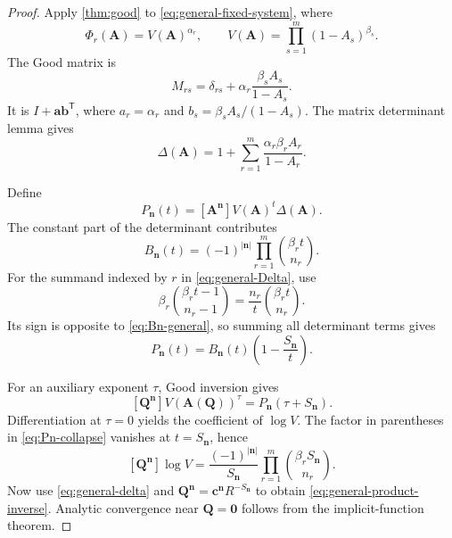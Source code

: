 \documentclass[11pt,oneside]{article}
\numberwithin{equation}{section}
\theoremstyle{plain}
\theoremstyle{definition}
\theoremstyle{remark}
\newcommand{\multi}[1]{\bm{#1}}
\begin{document}
\begin{proof}
Apply \cref{thm:good} to \cref{eq:general-fixed-system}, where
\[
 \Phi_r(\multi A)=V(\multi A)^{\alpha_r},
 \qquad
 V(\multi A)=\prod_{s=1}^m(1-A_s)^{\beta_s}.
\]
The Good matrix is
\begin{equation}\label{eq:general-Good-matrix}
 M_{rs}=\delta_{rs}
 +\alpha_r\frac{\beta_sA_s}{1-A_s}.
\end{equation}
It is \(I+\multi a\multi b^{\mathsf T}\), where
\(a_r=\alpha_r\) and
\(b_s=\beta_sA_s/(1-A_s)\).  The matrix determinant lemma gives
\begin{equation}\label{eq:general-Delta}
 \Delta(\multi A)=
 1+\sum_{r=1}^m\frac{\alpha_r\beta_rA_r}{1-A_r}.
\end{equation}

Define
\begin{equation}\label{eq:Pn-general}
 P_{\multi n}(t)=
 [\multi A^{\multi n}]V(\multi A)^t\Delta(\multi A).
\end{equation}
The constant part of the determinant contributes
\begin{equation}\label{eq:Bn-general}
 B_{\multi n}(t)=
 (-1)^{|\multi n|}
 \prod_{r=1}^m\binom{\beta_rt}{n_r}.
\end{equation}
For the summand indexed by \(r\) in \cref{eq:general-Delta}, use
\[
 \beta_r\binom{\beta_rt-1}{n_r-1}
 =\frac{n_r}{t}\binom{\beta_rt}{n_r}.
\]
Its sign is opposite to \cref{eq:Bn-general}, so summing all determinant
terms gives
\begin{equation}\label{eq:Pn-collapse}
 P_{\multi n}(t)=B_{\multi n}(t)
 \left(1-\frac{S_{\multi n}}t\right).
\end{equation}

For an auxiliary exponent \(\tau\), Good inversion gives
\begin{equation}\label{eq:general-Vtau}
 [\multi Q^{\multi n}]V(\multi A(\multi Q))^\tau
 =P_{\multi n}(\tau+S_{\multi n}).
\end{equation}
Differentiation at \(\tau=0\) yields the coefficient of \(\log V\).  The
factor in parentheses in \cref{eq:Pn-collapse} vanishes at
\(t=S_{\multi n}\), hence
\begin{equation}\label{eq:general-logV-coeff}
 [\multi Q^{\multi n}]\log V
 =\frac{(-1)^{|\multi n|}}{S_{\multi n}}
 \prod_{r=1}^m\binom{\beta_rS_{\multi n}}{n_r}.
\end{equation}
Now use \cref{eq:general-delta} and
\(
 \multi Q^{\multi n}=\multi c^{\multi n}R^{-S_{\multi n}}
\) to obtain \cref{eq:general-product-inverse}.  Analytic convergence near
\(\multi Q=\multi0\) follows from the implicit-function theorem.
\end{proof}
\end{document}
